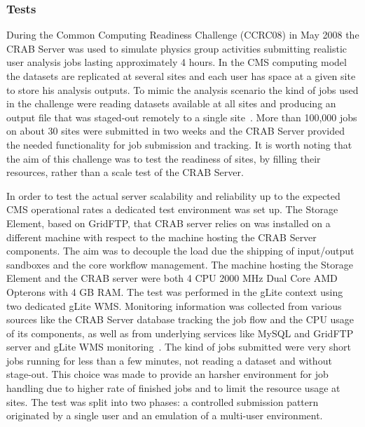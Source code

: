 \subsubsection{Tests}
\label{sec:4_3_1}
During the Common Computing Readiness Challenge (CCRC08) in May 2008
the CRAB Server was used to simulate physics group activities
submitting realistic user analysis jobs lasting approximately 4
hours. In the CMS computing model the datasets are replicated at
several sites and each user has space at a given site to store his
analysis outputs. To mimic the analysis scenario the kind of jobs used
in the challenge were reading datasets available at all sites and
producing an output file that was staged-out remotely to a single
site~\cite{Refsites}. More than 100,000 jobs on about 30 sites were
submitted in two weeks and the CRAB Server provided the needed
functionality for job submission and tracking. It is worth noting that
the aim of this challenge was to test the readiness of sites, by
filling their resources, rather than a scale test of the CRAB Server.

In order to test the actual server scalability and reliability up to
the expected CMS operational rates a dedicated test environment was
set up. The Storage Element, based on GridFTP, that CRAB server relies
on was installed on a different machine with respect to the machine
hosting the CRAB Server components. The aim was to decouple the load
due the shipping of input/output sandboxes and the core workflow
management. The machine hosting the Storage Element and the CRAB
server were both 4 CPU 2000 MHz Dual Core AMD Opterons with 4 GB
RAM. The test was performed in the gLite context using two dedicated
gLite WMS. Monitoring information was collected from various sources
like the CRAB Server database tracking the job flow and the CPU usage
of its components, as well as from underlying services like MySQL and
GridFTP server and gLite WMS monitoring~\cite{wmsMon}. The kind of
jobs submitted were very short jobs running for less than a few
minutes, not reading a dataset and without stage-out. This choice was
made to provide an harsher environment for job handling due to higher
rate of finished jobs and to limit the resource usage at sites.
The test was split into two phases: a controlled submission pattern
originated by a single user and an emulation of a multi-user
environment.

